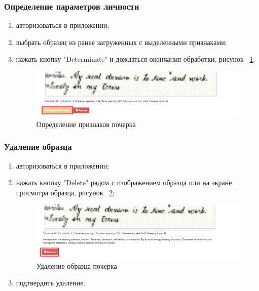 \subsubsection{Определение параметров личности}
\label{sec:manpage:client_man:determ_nature}
\begin{enumerate}
    \item[1)] авторизоваться в приложении;
    \item[2)] выбрать образец из ранее загруженных с выделенными признаками;
    \item[3)] нажать кнопку "Determinate" и дождаться окончания обработки, рисунок ~\ref{fig:manpage:client_man:determinate_nature}.
        \begin{figure}[ht]
            \centering
            \includegraphics[width=0.6\textheight]{figures/determinate_nature.png}
            \caption{Определение признаков почерка}
            \label{fig:manpage:client_man:determinate_nature}
        \end{figure}
\end{enumerate}

\subsubsection{Удаление образца}
\label{sec:manpage:client_man:delete_sample}
\begin{enumerate}
    \item[1)] авторизоваться в приложении;
    \item[2)] нажать кнопку "Delete" рядом с изображением образца или на экране просмотра образца, рисунок ~\ref{fig:manpage:client_man:delete_sample};
        \begin{figure}[ht]
            \centering
            \includegraphics[width=0.4\textheight]{figures/delete_sample.png}
            \caption{Удаление образца почерка}
            \label{fig:manpage:client_man:delete_sample}
        \end{figure}
    \item[3)] подтвердить удаление.
\end{enumerate}